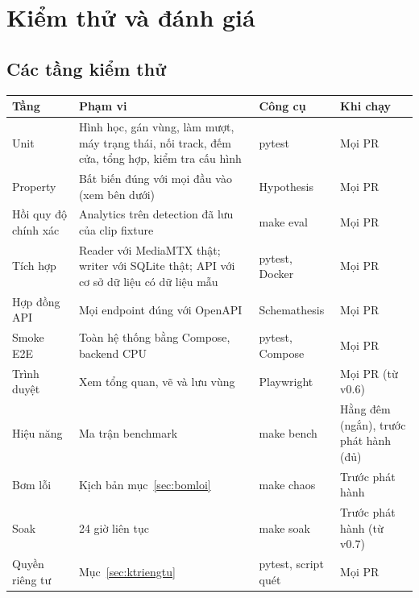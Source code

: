 \documentclass[10pt,a4paper,oneside,openany]{report}
\newcommand{\breakus}{\textunderscore\allowbreak}
\newcommand{\code}[1]{{\ttfamily\let\_\breakus #1}}
\newcommand{\tabhead}[1]{\textsf{\bfseries\color{ink}#1}}
\newenvironment{bang}{\par\small\rowcolors{2}{rowgray}{white}}{\par\vspace{0.3em}}
\begin{document}
\chapter{Kiểm thử và đánh giá}\label{ch:kiemthu}

\section{Các tầng kiểm thử}\label{sec:ktdonvi}
\begin{bang}
\begin{xltabular}{\linewidth}{L{30mm}Y L{30mm}L{24mm}}
\toprule
\tabhead{Tầng} & \tabhead{Phạm vi} & \tabhead{Công cụ} & \tabhead{Khi chạy} \\
\midrule
\endhead
Unit & Hình học, gán vùng, làm mượt, máy trạng thái, nối track, đếm cửa, tổng hợp, kiểm tra cấu hình & pytest & Mọi PR \\
Property & Bất biến đúng với mọi đầu vào (xem bên dưới) & Hypothesis & Mọi PR \\
Hồi quy độ chính xác & Analytics trên detection đã lưu của clip fixture & \code{make eval} & Mọi PR \\
Tích hợp & Reader với MediaMTX thật; writer với SQLite thật; API với cơ sở dữ liệu có dữ liệu mẫu & pytest, Docker & Mọi PR \\
Hợp đồng API & Mọi endpoint đúng với OpenAPI & Schemathesis & Mọi PR \\
Smoke E2E & Toàn hệ thống bằng Compose, backend CPU & pytest, Compose & Mọi PR \\
Trình duyệt & Xem tổng quan, vẽ và lưu vùng & Playwright & Mọi PR (từ v0.6) \\
Hiệu năng & Ma trận benchmark & \code{make bench} & Hằng đêm (ngắn), trước phát hành (đủ) \\
Bơm lỗi & Kịch bản mục~\ref{sec:bomloi} & \code{make chaos} & Trước phát hành \\
Soak & 24 giờ liên tục & \code{make soak} & Trước phát hành (từ v0.7) \\
Quyền riêng tư & Mục~\ref{sec:ktriengtu} & pytest, script quét & Mọi PR \\
\bottomrule
\end{xltabular}
\end{bang}
\end{document}
